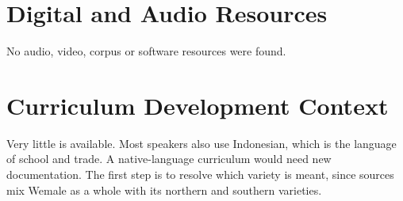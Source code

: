 \documentclass[12pt]{article}
\begin{document}
\section{Digital and Audio Resources}
No audio, video, corpus or software resources were found.

\section{Curriculum Development Context}
Very little is available. Most speakers also use Indonesian, which is the language of school and trade. A native-language curriculum would need new documentation. The first step is to resolve which variety is meant, since sources mix Wemale as a whole with its northern and southern varieties.
\end{document}
